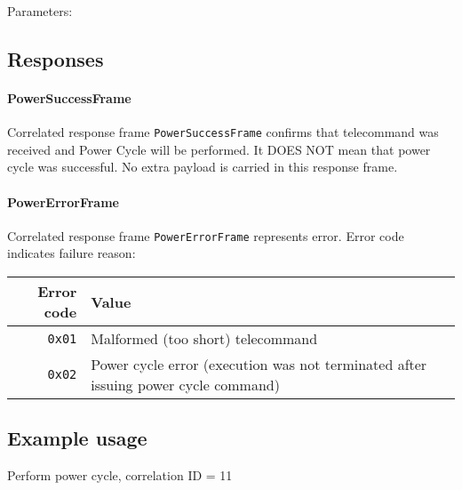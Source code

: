 Parameters: 

\begin{tcarglist}
\end{tcarglist}


\subsection{Responses}

\paragraph{PowerSuccessFrame}
Correlated response frame \texttt{PowerSuccessFrame} confirms that telecommand was received and Power Cycle will be performed. It DOES NOT mean that power cycle was successful. No extra payload is carried in this response frame.

\paragraph{PowerErrorFrame}
Correlated response frame \texttt{PowerErrorFrame} represents error. Error code indicates failure reason:

\begin{tabular}{r | l}
	Error code & Value \\
	\hline
	\texttt{0x01} & Malformed (too short) telecommand \\
	\texttt{0x02} & Power cycle error (\OBC execution was not terminated after issuing power cycle command) \\
	
\end{tabular}

\subsection{Example usage}
Perform power cycle, correlation ID = 11

